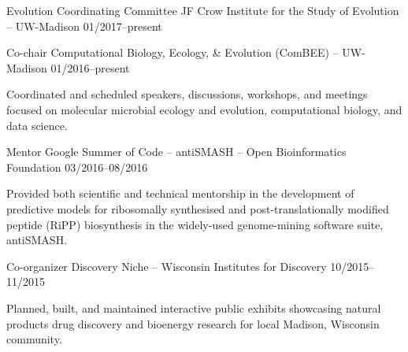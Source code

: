 

\begin{cventries}

  \cventry
    {Evolution Coordinating Committee} %
    {JF Crow Institute for the Study of Evolution -- UW-Madison} %
    {} %
    {01/2017--present} %
    {
    }

  \cventry
    {Co-chair} %
    {Computational Biology, Ecology, \& Evolution (ComBEE) -- UW-Madison} %
    {} %
    {01/2016--present} %
    {
      \begin{cvitems} %
        \item {Coordinated and scheduled speakers, discussions, workshops, and meetings focused on molecular microbial ecology and evolution, computational biology, and data science.}
      \end{cvitems}
    }

  \cventry
    {Mentor} %
    {Google Summer of Code -- antiSMASH -- Open Bioinformatics Foundation} %
    {} %
    {03/2016--08/2016} %
    {
      \begin{cvitems} %
        \item {Provided both scientific and technical mentorship in the development of predictive models for ribosomally synthesised and post-translationally modified peptide (RiPP) biosynthesis in the widely-used genome-mining software suite, antiSMASH.}
      \end{cvitems}
    }
    
  \cventry
    {Co-organizer} %
    {Discovery Niche -- Wisconsin Institutes for Discovery} %
    {} %
    {10/2015--11/2015} %
    {
      \begin{cvitems} %
        \item {Planned, built, and maintained interactive public exhibits showcasing natural products drug discovery and bioenergy research for local Madison, Wisconsin community.}
      \end{cvitems}
    }
    

\end{cventries}
